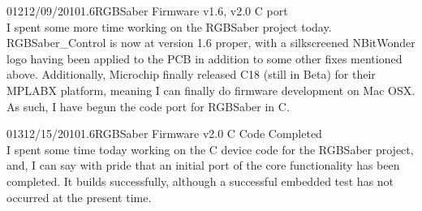 \documentclass[12pt,letterpaper,onecolumn]{article}
\begin{document}
\begin{nbentry}{012}{12/09/2010}{1.6}{RGBSaber Firmware v1.6, v2.0 C port}
\\	I spent some more time working on the RGBSaber project today. RGBSaber\_Control is now at version 1.6 proper, with a silkscreened NBitWonder logo having been applied to the PCB in addition to some other fixes mentioned above. Additionally, Microchip finally released C18 (still in Beta) for their MPLABX platform, meaning I can finally do firmware development on Mac OSX. As such, I have begun the code port for RGBSaber in C.
\end{nbentry}

\begin{nbentry}{013}{12/15/2010}{1.6}{RGBSaber Firmware v2.0 C Code Completed}
\\	I spent some time today working on the C device code for the RGBSaber project, and, I can say with pride that an initial port of the core functionality has been completed. It builds successfully, although a successful embedded test has not occurred at the present time.
\end{nbentry}

\end{document}
